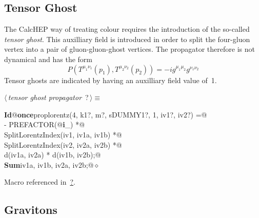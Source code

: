 \documentclass[a4paper,12pt]{amsart}
\renewcommand{\NWtarget}[2]{\hypertarget{#1}{#2}}
\renewcommand{\NWlink}[2]{\hyperlink{#1}{#2}}
\renewcommand{\NWtxtMacroRefIn}{Macro referenced in}
\renewcommand{\NWsep}{${\diamond}$}
\begin{document}
\subsection{Tensor Ghost}
The CalcHEP way of treating colour requires the introduction of
the so-called \textit{tensor ghost}. This auxilliary field is introduced
in order to split the four-gluon vertex into a pair of gluon-gluon-ghost
vertices. The propagator therefore is not dynamical and has the form
\begin{equation}
P(T^{\mu_1\nu_1}(p_1),T^{\mu_2\nu_2}(p_2))=-ig^{\mu_1\mu_2}g^{\nu_1\nu_2}
\end{equation}
Tensor ghosts are indicated by having an auxilliary field value of~1.
\begin{flushleft} \small
\begin{minipage}{\linewidth}\label{scrap37}\raggedright\small
\NWtarget{nuweb?}{} $\langle\,${\it tensor ghost propagator}\nobreak\ {\footnotesize {?}}$\,\rangle\equiv$
\vspace{-1ex}
\begin{list}{}{} \item
\mbox{}\verb@@\hbox{\sffamily\bfseries Id}\verb@ @\hbox{\sffamily\bfseries once}\verb@ proplorentz(4, k1?, m?, sDUMMY1?, 1, iv1?, iv2?) =@\\
\mbox{}\verb@   - PREFACTOR(@\hbox{\sffamily\bfseries i}\verb@_) *@\\
\mbox{}\verb@     SplitLorentzIndex(iv1, iv1a, iv1b) *@\\
\mbox{}\verb@     SplitLorentzIndex(iv2, iv2a, iv2b) *@\\
\mbox{}\verb@     d(iv1a, iv2a) * d(iv1b, iv2b);@\\
\mbox{}\verb@@\hbox{\sffamily\bfseries Sum}\verb@ iv1a, iv1b, iv2a, iv2b;@{\NWsep}
\end{list}
\vspace{-1.5ex}
\footnotesize
\begin{list}{}{\setlength{\itemsep}{-\parsep}\setlength{\itemindent}{-\leftmargin}}
\item \NWtxtMacroRefIn\ \NWlink{nuweb?}{?}.

\item{}
\end{list}
\end{minipage}\vspace{4ex}
\end{flushleft}
\subsection{Gravitons}
\end{document}
